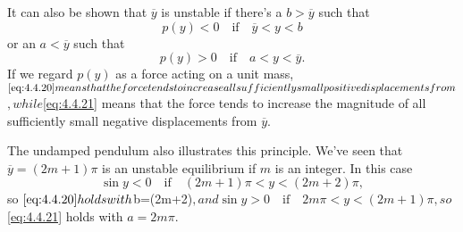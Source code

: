 \documentclass{ximera}
\begin{document}
It can also be shown %
that $\overline{y}$ is
unstable if there's a $b>\overline{y}$ such that
\begin{equation} \label{eq:4.4.20}
p(y)<0\quad\mbox{if}\quad\overline{y}<y<b
\end{equation}
or an $a<\overline{y}$ such that
\begin{equation} \label{eq:4.4.21}
p(y)>0\quad\mbox{if}\quad a<y<\overline{y}.
\end{equation}
If we regard $p(y)$ as a force acting on a unit mass,
$\eqref{eq:4.4.20} means that the force tends to increase all sufficiently
small positive displacements from $$, while $\eqref{eq:4.4.21}
means that the force tends to increase the magnitude of all
sufficiently small negative displacements from $\overline{y}$.
 
The undamped pendulum also illustrates this principle. We've seen that
$\overline{y}=(2m+1)\pi$ is an unstable equilibrium if $m$ is an
integer. In this case
$$
\sin y<0\quad\mbox{if}\quad(2m+1)\pi<y<(2m+2)\pi,
$$
so $\eqref{eq:4.4.20} holds with $b=(2m+2)\pi$, and
$$
\sin y>0\quad\mbox{if}\quad 2m\pi<y<(2m+1)\pi,
$$
so $\eqref{eq:4.4.21} holds with $a=2m\pi$.
 
\end{document}

